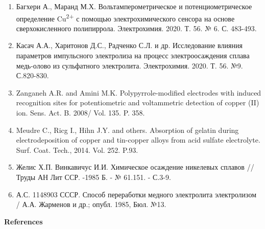 \begin{enumerate}
\item
Багхери А., Маранд М.Х. Вольтамперометрическое и потенциометрическое
определение Cu\textsuperscript{2+} с помощью электрохимического сенсора
на основе сверхокисленного полипиррола. Электрохимия. 2020. Т. 56. № 6.
С. 483-493.

\item
Касач А.А., Харитонов Д.С., Радченко С.Л. и др. Исследование влияния
параметров импульсного электролиза на процесс электроосаждения сплава
медь-олово из сульфатного электролита. Электрохимия. 2020. Т. 56. №9.
С.820-830.

\item
Zanganeh A.R. and Amini M.K. Polypyrrole-modified electrodes with
induced recognition sites for potentiometric and voltammetric detection
of copper (II) ion. Sens. Act. B. 2008/ Vol. 135. P. 358.

\item
Meudre C., Ricg I., Hihn J.Y. and others. Absorption of gelatin
during electrodeposition of copper and tin-copper alloys from acid
sulfate electrolyte. Surf. Coat. Tech., 2014. Vol. 252. P.93.

\item
Желис Х.П. Винкавичус И.И. Химическое осаждение никелевых сплавов //
Труды АН Лит ССР. -1985 Б. - № 61.151. - С.3-9.

\item
А.С. 1148903 СССР. Способ переработки медного электролита
электролизом / А.А. Жарменов и др.; опубл. 1985, Бюл. №13.
\end{enumerate}

\begin{center}
{\bfseries References}
\end{center}

